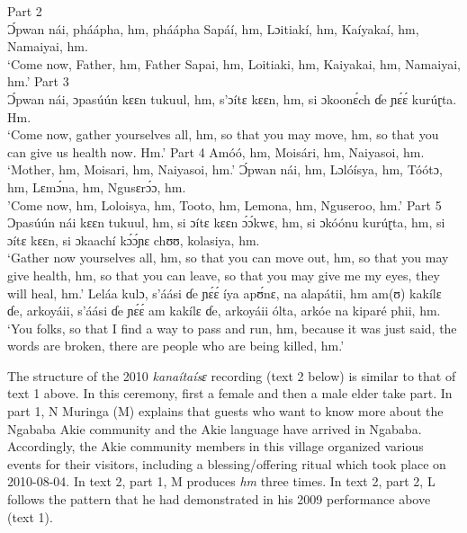 \documentclass[output=paper,colorlinks,citecolor=brown]{langscibook}
\begin{document}

\ea   Part 2\\
      Ɔ́pwan nái, pháápha, hm, pháápha Sapáí, hm, Lɔitiakí, hm, Kaíyakaí, hm, Namaiyai, hm.\\
      `Come now, Father, hm, Father Sapai, hm, Loitiaki, hm, Kaiyakai, hm, Namaiyai, hm.'
\ex   Part 3\\
      Ɔ́pwan nái, ɔpasúún kɛɛn tukuul, hm, s’ɔítɛ kɛɛn, hm, si ɔkoonɛ́ch ɗe ɲɛ́ɛ́ kurúɽta. Hm.\\
      `Come now, gather yourselves all, hm, so that you may move, hm, so that you can  give us health now. Hm.'
\ex   Part 4
      \ea Amóó, hm, Moisári, hm, Naiyasoi, hm.\\
          `Mother, hm, Moisari, hm, Naiyasoi, hm.'
      \ex Ɔ́pwan nái, hm, Lɔlóísya, hm, Tóótɔ, hm, Lɛmɔ́na, hm, Ngusɛrɔ́ɔ, hm.\\
          'Come now, hm, Loloisya, hm, Tooto, hm, Lemona, hm, Nguseroo, hm.'
      \z
\ex   Part 5
    \ea Ɔpasúún nái kɛɛn tukuul, hm, si ɔítɛ kɛɛn ɔ́ɔ́kwɛ, hm, si ɔkóónu kurúɽta, hm, si ɔítɛ kɛɛn, si ɔkaachí kɔ́ɔ́ɲɛ chʊʊ, kolasiya, hm.\\
        `Gather now yourselves all, hm, so that you can move out, hm, so that you may give health, hm, so that you can leave, so that you may give me my eyes, they will heal, hm.'
    \ex Leláa kulɔ, s’áási ɗe ɲɛ́ɛ́ íya apʊ́nɛ, na alapátii, hm am(ʊ) kakílɛ ɗe, arkoyáii, s’áási ɗe ɲɛ́ɛ́ am kakílɛ ɗe, arkoyáii ólta, arkóe na kiparé phii, hm.\\
        `You folks, so that I find a way to pass and run, hm, because it was just said, the words are broken, there are people who are being killed, hm.'
    \z
\z

The structure of the 2010 \textit{kanaítaísɛ }recording (text 2 below) is similar to that of text 1 above. In this ceremony, first a female and then a male elder take part. In part 1, N Muringa (M) explains that guests who want to know more about the Ngababa Akie community and the Akie language have arrived in Ngababa. Accordingly, the Akie community members in this village organized various events for their visitors, including a blessing/offering ritual which took place on 2010-08-04. 
In text 2, part 1, M produces \textit{hm} three times. In text 2, part 2, L follows the pattern that he had demonstrated in his 2009 performance above (text 1).

\end{document}
